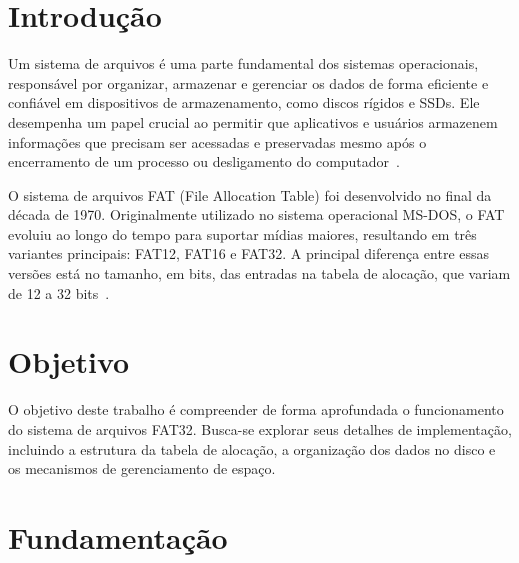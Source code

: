 \documentclass[
    12pt,				%
    oneside,   	        %
    a4paper,			%
    english,			%
    french,				%
    spanish,			%
    brazil,				%
    ]{pacotes/abntex2}
\begin{document}
\tableofcontents*
\cleardoublepage

\textual

\makeatletter
\renewcommand{\chapter}{\@gobbletwo}
\makeatother

\section{Introdução}
\label{sec:introducao}

Um sistema de arquivos é uma parte fundamental dos sistemas operacionais, responsável por organizar, armazenar e gerenciar os dados de forma eficiente e confiável em dispositivos de armazenamento, como discos rígidos e SSDs. Ele desempenha um papel crucial ao permitir que aplicativos e usuários armazenem informações que precisam ser acessadas e preservadas mesmo após o encerramento de um processo ou desligamento do computador~\cite{tanenbaum2016}.

O sistema de arquivos FAT (File Allocation Table) foi desenvolvido no final da década de 1970. Originalmente utilizado no sistema operacional MS-DOS, o FAT evoluiu ao longo do tempo para suportar mídias maiores, resultando em três variantes principais: FAT12, FAT16 e FAT32. A principal diferença entre essas versões está no tamanho, em bits, das entradas na tabela de alocação, que variam de 12 a 32 bits~\cite{microsoft2000}.

\section{Objetivo}
\label{sec:objetivos}

O objetivo deste trabalho é compreender de forma aprofundada o funcionamento do sistema de arquivos FAT32. Busca-se explorar seus detalhes de implementação, incluindo a estrutura da tabela de alocação, a organização dos dados no disco e os mecanismos de gerenciamento de espaço.

\section{Fundamentação}
\label{sec:fundamentacao}
\end{document}
